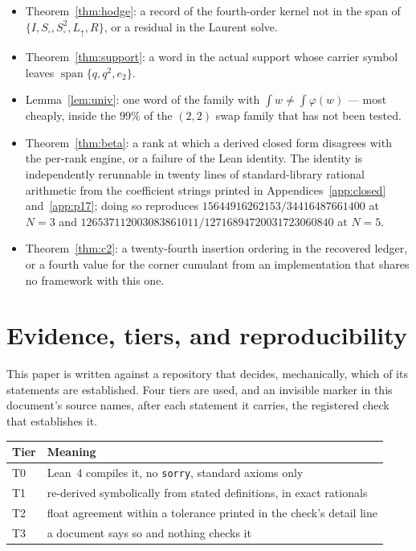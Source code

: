 \documentclass[11pt]{article}
\theoremstyle{definition}
\theoremstyle{remark}
\newcommand{\Lup}{L_{\uparrow}}
\newcommand{\Ssq}{S_{\square}}
\begin{document}
\begin{itemize}\itemsep2pt
\item Theorem~\ref{thm:hodge}: a record of the fourth-order kernel not in the
  span of $\{I,\Ssq,\Ssq^2,\Lup,R\}$, or a residual in the Laurent solve.
\item Theorem~\ref{thm:support}: a word in the actual support whose carrier
  symbol leaves $\operatorname{span}\{q,q^2,e_2\}$.
\item Lemma~\ref{lem:univ}: one word of the family with
  $\int w\ne\int\varphi(w)$ --- most cheaply, inside the $99\%$ of the $(2,2)$
  swap family that has not been tested.
\item Theorem~\ref{thm:beta}: a rank at which a derived closed form disagrees
  with the per-rank engine, or a failure of the Lean identity. The identity is
  independently rerunnable in twenty lines of standard-library rational
  arithmetic from the coefficient strings printed in
  Appendices~\ref{app:closed} and~\ref{app:p17}; doing so reproduces
  $15644916262153/34416487661400$ at $N=3$ and
  $126537112003083861011/12716894720031723060840$ at $N=5$.
\item Theorem~\ref{thm:c2}: a twenty-fourth insertion ordering in the recovered
  ledger, or a fourth value for the corner cumulant from an implementation that
  shares no framework with this one.
\end{itemize}

\section{Evidence, tiers, and reproducibility}\label{sec:evidence}

This paper is written against a repository that decides, mechanically, which of
its statements are established. Four tiers are used, and an invisible marker in
this document's source names, after each statement it carries, the registered
check that establishes it.

\begin{center}
\begin{tabular}{@{}ll@{}}
\toprule
Tier & Meaning\\
\midrule
T0 & Lean~4 compiles it, no \texttt{sorry}, standard axioms only\\
T1 & re-derived symbolically from stated definitions, in exact rationals\\
T2 & float agreement within a tolerance printed in the check's detail line\\
T3 & a document says so and nothing checks it\\
\bottomrule
\end{tabular}
\end{center}
\end{document}
